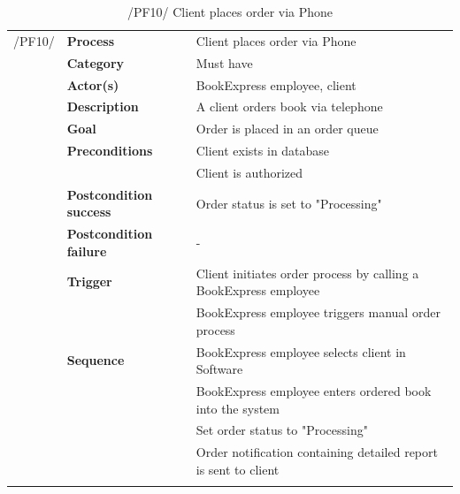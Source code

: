 \documentclass[11pt,a4paper,oneside,svgnames]{report}
\begin{document}
\begin{table}[H]
\centering
\begin{tabular}{p{1.5cm}p{3cm}p{8cm}}
\cellcolor{white}	 /PF10/	& \textbf{Process} & Client places order via Phone\\ 
\cellcolor{white}		& \textbf{Category} & Must have\\
\cellcolor{white}		& \textbf{Actor(s)} & BookExpress employee, client\\ 
\cellcolor{white}		& \textbf{Description}	 & A client orders book via telephone\\ 
\cellcolor{white}		& \textbf{Goal} & Order is placed in an order queue\\
\cellcolor{white}		& \textbf{Preconditions} & Client exists in database\\
\cellcolor{white}		& & Client is authorized\\
\cellcolor{white}		& \textbf{Postcondition success} & Order status is set to "Processing"\\
\cellcolor{white}		& \textbf{Postcondition failure} & -\\
\cellcolor{white}		& \textbf{Trigger} & Client initiates order process by calling a BookExpress employee\\
\cellcolor{white}		& & BookExpress employee triggers manual order process\\
\cellcolor{white}		& \textbf{Sequence} & BookExpress employee selects client in Software\\
\cellcolor{white}		& & BookExpress employee enters ordered book into the system\\
\cellcolor{white}		& & Set order status to "Processing"\\
\cellcolor{white}		& & Order notification containing detailed report is sent to client\\
\cellcolor{white}\hfill \\
\end{tabular}
\caption{/PF10/ Client places order via Phone}
\label{tab:pf10}
\end{table}
\end{document}
